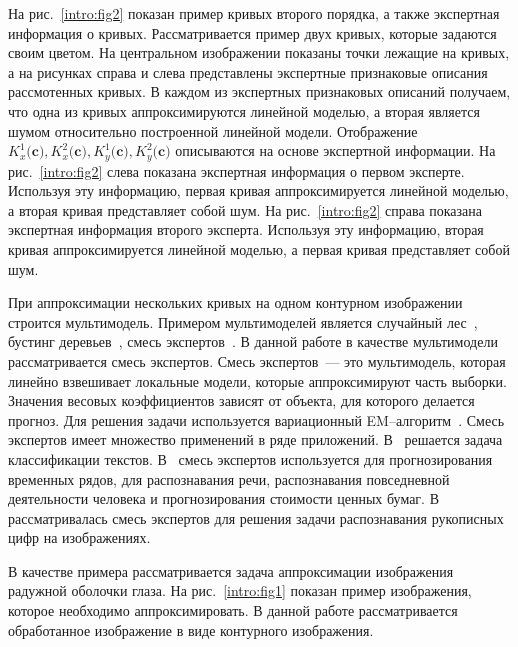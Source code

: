 \documentclass[12pt]{a&t}
\begin{document}
На рис.~\ref{intro:fig2} показан пример кривых второго порядка, а также экспертная информация о кривых. Рассматривается пример двух кривых, которые задаются своим цветом. На центральном изображении показаны точки лежащие на кривых, а на рисунках справа и слева представлены экспертные признаковые описания рассмотенных кривых. В каждом из экспертных признаковых описаний получаем, что одна из кривых аппроксимируются линейной моделью, а вторая является шумом относительно построенной линейной модели. Отображение~$K_x^1\bigr(\mathbf{c}\bigr), K_x^2\bigr(\mathbf{c}\bigr), K_y^1\bigr(\mathbf{c}\bigr), K_y^2\bigr(\mathbf{c}\bigr)$ описываются на основе экспертной информации. На рис.~\ref{intro:fig2} слева показана экспертная информация о первом эксперте. Используя эту информацию, первая кривая аппроксимируется линейной моделью, а вторая кривая представляет собой шум. На рис.~\ref{intro:fig2} справа показана экспертная информация второго эксперта. Используя эту информацию, вторая кривая аппроксимируется линейной моделью, а первая кривая представляет собой шум.

При аппроксимации нескольких кривых на одном контурном изображении строится мультимодель. Примером мультимоделей является случайный лес~\cite{Ishwaran2012}, бустинг деревьев~\cite{Tianqi2016}, смесь экспертов~\cite{Yuksel2012}.
В данной работе в качестве мультимодели рассматривается смесь экспертов.
Смесь экспертов~--- это мультимодель, которая линейно взвешивает локальные модели, которые аппроксимируют часть выборки.
Значения весовых коэффициентов зависят от объекта, для которого делается прогноз.
Для решения задачи используется вариационный EM--алгоритм~\cite{Dempster1977, Ebrahimpour2009, Peng1996, Grabovoy2021}.
Смесь экспертов имеет множество применений в ряде приложений.
В~\cite{Estabrooks2001} решается задача классификации текстов.
В~\cite{Cheung1995, Weigend2000, Cao2003, Mossavat2010, Sminchisescu2007, Tuerk2001, Yumlu2003} смесь экспертов используется для прогнозирования временных рядов, для распознавания речи, распознавания повседневной деятельности человека и прогнозирования стоимости ценных бумаг.
В~\cite{Ebrahimpour2009} рассматривалась смесь экспертов для решения задачи распознавания рукописных цифр на изображениях.

В качестве примера рассматривается задача аппроксимации изображения радужной оболочки глаза. На рис.~\ref{intro:fig1} показан пример изображения, которое необходимо аппроксимировать.
В данной работе рассматривается обработанное изображение в виде контурного изображения.
\end{document}
